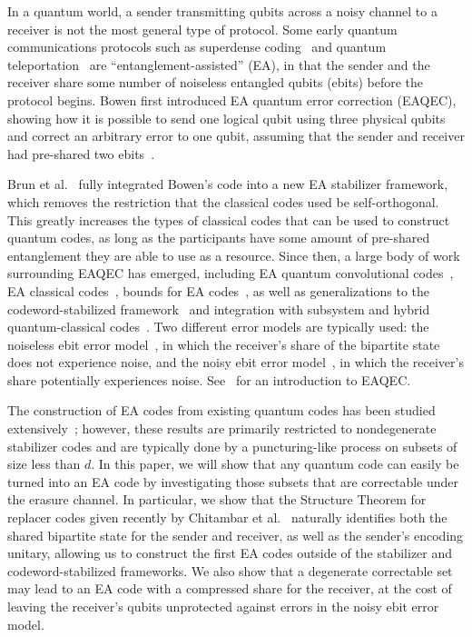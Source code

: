 \documentclass[]{amsart}
\begin{document}
In a quantum world, a sender transmitting qubits across a noisy channel to a receiver is not the most general type of protocol.
Some early quantum communications protocols such as superdense coding~\cite{BW1992} and quantum teleportation~\cite{BBCJPW1993} are ``entanglement-assisted'' (EA), in that the sender and the receiver share some number of noiseless entangled qubits (ebits) before the protocol begins.
Bowen first introduced EA quantum error correction (EAQEC), showing how it is possible to send one logical qubit using three physical qubits and correct an arbitrary error to one qubit, assuming that the sender and receiver had pre-shared two ebits~\cite{Bow2002}.

Brun et al.~\cite{BDH2006,BDH2014} fully integrated Bowen's code into a new EA stabilizer framework, which removes the restriction that the classical codes used be self-orthogonal.
This greatly increases the types of classical codes that can be used to construct quantum codes, as long as the participants have some amount of pre-shared entanglement they are able to use as a resource.
Since then, a large body of work surrounding EAQEC has emerged, including EA quantum convolutional codes~\cite{WB2009,WB2010Apr,WB2010Jun}, EA classical codes~\cite{SKMB2010,PG2025}, bounds for EA codes~\cite{LA2018,Gra2021,LTY2024,DDSB2025}, as well as generalizations to the codeword-stabilized framework~\cite{SHB2011,AJH2016} and integration with subsystem and hybrid quantum-classical codes~\cite{HDB2007,KHB2008,SHB2013,NADKV2024}.
Two different error models are typically used: the noiseless ebit error model~\cite{BDH2006}, in which the receiver's share of the bipartite state does not experience noise, and the noisy ebit error model~\cite{LB2012}, in which the receiver's share potentially experiences noise.
See~\cite{BH2013} for an introduction to EAQEC.

The construction of EA codes from existing quantum codes has been studied extensively~\cite{LB2012,GHMR2019,GHMR2021,GHW2022,UM2022}; however, these results are primarily restricted to nondegenerate stabilizer codes and are typically done by a puncturing-like process on subsets of size less than $d$.
In this paper, we will show that any quantum code can easily be turned into an EA code by investigating those subsets that are correctable under the erasure channel.
In particular, we show that the Structure Theorem for replacer codes given recently by Chitambar et al.~\cite{CHKNN2025} naturally identifies both the shared bipartite state for the sender and receiver, as well as the sender's encoding unitary, allowing us to construct the first EA codes outside of the stabilizer and codeword-stabilized frameworks.
We also show that a degenerate correctable set may lead to an EA code with a compressed share for the receiver, at the cost of leaving the receiver's qubits unprotected against errors in the noisy ebit error model.
\end{document}
